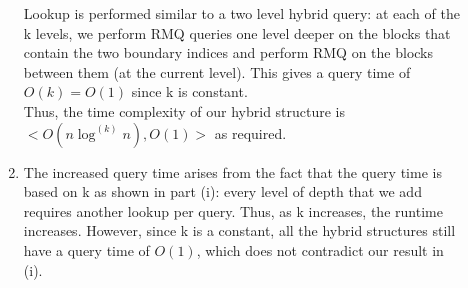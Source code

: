 \documentclass[11pt,oneside,a4paper]{article}
\begin{document}
\begin{description}
\begin{enumerate}[label=\roman*]
Lookup is performed similar to a two level hybrid query: at each of the k levels, we perform RMQ queries one level deeper on the blocks that contain the two boundary indices and perform RMQ on the blocks between them (at the current level). This gives a query time of $O(k) = O(1)$ since k is constant. \\

Thus, the time complexity of our hybrid structure is $<O(n\log^{(k)}n), O(1)>$ as required.

\item The increased query time arises from the fact that the query time is based on k as shown in part (i): every level of depth that we add requires another lookup per query. Thus, as k increases, the runtime increases. However, since k is a constant, all the hybrid structures still have a query time of $O(1)$, which does not contradict our result in (i).

\end{enumerate}

\end{description}
\end{document}

